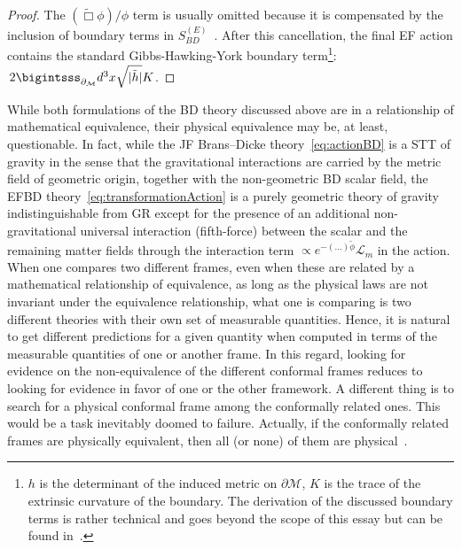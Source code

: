 \begin{proof}
  The $(\tilde{\Box} \phi)/ \phi$ term is usually omitted because it is compensated by the inclusion of boundary terms in $S^{(E)}_{BD}$~\cite{Quiros:2019ktw}. After this cancellation, the final EF action contains the standard Gibbs-Hawking-York boundary term\footnote{$h$ is the determinant of the induced metric on $\partial \mathcal{M}$, $K$ is the trace of the extrinsic curvature of the boundary. The derivation of the discussed boundary terms is rather technical and goes beyond the scope of this essay but can be found in~\cite{Lidsey_2000}.}: $\,2 \bigintsss_{\partial_\mathcal{M}} d^3x \sqrt{|\tilde{h}|}K$.
\end{proof}

While both formulations of the BD theory discussed above are in a relationship of mathematical equivalence, their physical equivalence may be, at least, questionable. 
In fact, while the JF Brans–Dicke theory~\eqref{eq:actionBD} is a STT of gravity in the sense that the gravitational interactions are carried by the metric field of geometric origin, together with the non-geometric BD scalar field, the EFBD theory~\eqref{eq:transformationAction} is a purely geometric theory of gravity indistinguishable from GR except for the presence of an additional non-gravitational universal interaction (fifth-force) between the scalar and the remaining matter fields through the interaction term $\propto e^{-(\dots)\tilde{\phi}}\mathcal{L}_m$ in the action.
When one compares two different frames, even when these are related by a mathematical relationship of equivalence, as long as the physical laws are not invariant under the equivalence relationship, what one is comparing is two different theories with their own set of measurable quantities. Hence, it is natural to get different predictions for a given quantity when computed in terms of the measurable quantities of one or another frame. 
In this regard, looking for evidence on the non-equivalence of the different conformal frames reduces to looking for evidence in favor of one or the other framework. A different thing is to search for a physical conformal frame among the conformally related ones. This would be a task inevitably doomed to failure. Actually, if the conformally related frames are physically equivalent, then all (or none) of them are physical~\cite{Quiros:2019ktw}.